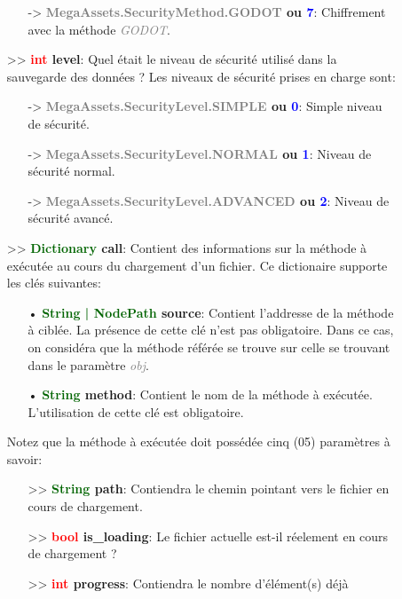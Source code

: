 \documentclass[a4paper, 11pt]{article}
\begin{document}
\begin{description}
\begin{itemize}
\begin{itemize}
				\item [-> \textbf{\textcolor{gray}{MegaAssets.SecurityMethod.GODOT} ou \textcolor{blue}
				{7}}:] Chiffrement avec la méthode \textit{\textcolor{gray}{GODOT}}.
			\end{itemize}
			\item [>> \textbf{\textcolor{red}{int} level}:] Quel était le niveau de sécurité utilisé dans la 
			sauvegarde des données ? Les niveaux de sécurité prises en charge sont:
			\begin{itemize}
				\item [-> \textbf{\textcolor{gray}{MegaAssets.SecurityLevel.SIMPLE} ou \textcolor{blue}
				{0}}:] Simple niveau de sécurité.
				\item [-> \textbf{\textcolor{gray}{MegaAssets.SecurityLevel.NORMAL} ou \textcolor{blue}
				{1}}:] Niveau de sécurité normal.
				\item [-> \textbf{\textcolor{gray}{MegaAssets.SecurityLevel.ADVANCED} ou \textcolor{blue}
				{2}}:] Niveau de sécurité avancé.
			\end{itemize}
			\item [>> \textbf{\textcolor{darkgreen}{Dictionary} call}:] Contient des informations sur la
			méthode à exécutée au cours du chargement d'un fichier. Ce dictionaire supporte les clés
			suivantes:
			\begin{itemize}
			   \newpage \item[• \textbf{\textcolor{darkgreen}{String | NodePath} source}:] Contient
			   l'addresse de la méthode à ciblée. La présence de cette clé n'est pas obligatoire. Dans ce
			   cas, on considéra que la méthode référée se trouve sur celle se trouvant dans le paramètre
			   \textit{\textcolor{gray}{obj}}.
			   \item[• \textbf{\textcolor{darkgreen}{String} method}:] Contient le nom de la méthode à 
			   exécutée. L'utilisation de cette clé est obligatoire.
			\end{itemize}
			Notez que la méthode à exécutée doit possédée cinq (05) paramètres à savoir:
			\begin{itemize}
				\item [>> \textbf{\textcolor{darkgreen}{String} path}:] Contiendra le chemin pointant vers
				le fichier en cours de chargement.
				\item [>> \textbf{\textcolor{red}{bool} is\_loading}:] Le fichier actuelle est-il réelement 
				en cours de chargement ?
				\item [>> \textbf{\textcolor{red}{int} progress}:] Contiendra le nombre d'élément(s) déjà

\end{itemize}
\end{itemize}
\end{description}
\end{document}

